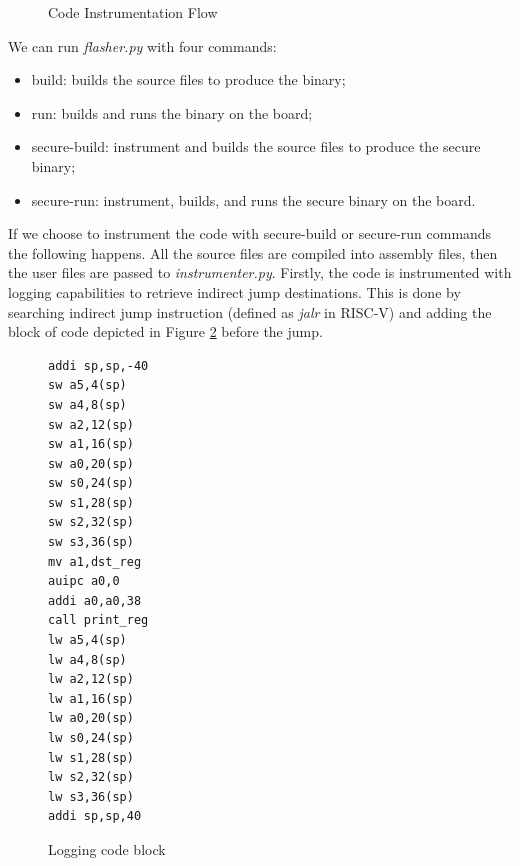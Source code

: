 \begin{figure}[htbp]
  \centering
  \def\stackalignment{r} %
  {\scriptsize }
  \caption{Code Instrumentation Flow}
  \label{fig:instrumentation}
\end{figure}

We can run \textit{flasher.py} with four commands:
\begin{itemize}[noitemsep]
  \item build: builds the source files to produce the binary;

  \item run: builds and runs the binary on the board;

  \item secure-build: instrument and builds the source files to produce the
    secure binary;

  \item secure-run: instrument, builds, and runs the secure binary on the board.
\end{itemize}

If we choose to instrument the code with secure-build or secure-run commands the
following happens. All the source files are compiled into assembly files, then
the user files are passed to \textit{instrumenter.py}. Firstly, the code is instrumented
with logging capabilities to retrieve indirect jump destinations. This is done
by searching indirect jump instruction (defined as \textit{jalr} in RISC-V) and adding
the block of code depicted in Figure \ref{fig:loggingblock} before the jump.

\begin{figure}
  \setlength{\intextsep}{0pt}
  \begin{minipage}{0.25\textwidth}
    \begin{lstlisting}[style=Assembly]
addi sp,sp,-40
sw a5,4(sp)
sw a4,8(sp)
sw a2,12(sp)
sw a1,16(sp)
sw a0,20(sp)
sw s0,24(sp)
sw s1,28(sp)
sw s2,32(sp)
sw s3,36(sp)
mv a1,dst_reg
auipc a0,0
addi a0,a0,38
call print_reg
lw a5,4(sp)
lw a4,8(sp)
lw a2,12(sp)
lw a1,16(sp)
lw a0,20(sp)
lw s0,24(sp)
lw s1,28(sp)
lw s2,32(sp)
lw s3,36(sp)
addi sp,sp,40
\end{lstlisting}
  \end{minipage}
  \caption{Logging code block}
  \label{fig:loggingblock}
\end{figure}

